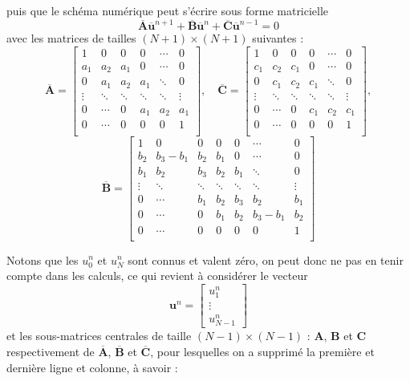 \documentclass[a4,12pt]{article}
\newcommand{\A}{\mathbf{A}}
\newcommand{\B}{\mathbf{B}}
\newcommand{\C}{\mathbf{C}}
\newcommand{\ub}{\mathbf{u}}
\begin{document}
	    puis que le schéma numérique peut s'écrire sous forme matricielle
	    \begin{equation}
	      \overline{\A} \overline{\ub}^{n+1}+\overline{\B} \overline{\ub}^n+\overline{\C} \overline{\ub}^{n-1}=0
	    \end{equation} 
	    avec les matrices de tailles $(N+1)\times (N+1)$ suivantes : 
	    \[
	      \overline{\A}=
	      \begin{bmatrix}
		1 & 0 & 0 & 0 & \cdots & 0 \\ 
		a_1 & a_2 & a_1 & 0 & \cdots & 0 \\ 
		0 & a_1 & a_2 & a_1 & \ddots & 0 \\
		\vdots & \ddots & \ddots & \ddots & \ddots & \vdots \\ 
		0 & \cdots & 0 & a_1 & a_2 & a_1\\ 
		0 & \cdots & 0 & 0 & 0 & 1 \\
	      \end{bmatrix},\quad 
	      \overline{\C}=
	      \begin{bmatrix}
		1 & 0 & 0 & 0 & \cdots & 0 \\ 
		c_1 & c_2 & c_1 & 0 & \cdots & 0 \\
		0 & c_1 & c_2 & c_1 & \ddots & 0 \\ 
		\vdots & \ddots & \ddots & \ddots & \ddots & \vdots \\
		0 & \cdots & 0 & c_1 & c_2 & c_1 \\
		0 & \cdots & 0 & 0 & 0 & 1 \\
	      \end{bmatrix},
	    \]
	    \[ 
	      \overline{\B}=
	      \begin{bmatrix}
		1 & 0 & 0 & 0 & 0  & \cdots & 0 \\ 
		b_2 & b_3-b_1 & b_2 & b_1 & 0 & \cdots & 0 \\ 
		b_1 & b_2 & b_3 & b_2 & b_1 & \ddots & 0 \\
		\vdots & \ddots & \ddots & \ddots & \ddots & \ddots & \vdots \\ 
		0 & \cdots & b_1 & b_2 & b_3 & b_2 & b_1 \\ 
		0 & \cdots &  0 & b_1 & b_2 & b_3-b_1 & b_2 \\ 
		0 & \cdots & 0 & 0 &  0 & 0 & 1 \\
	      \end{bmatrix}
	    \]


	    Notons que les $u_0^n$ et $u_{N}^n$ sont connus et valent zéro, on peut donc ne pas en tenir compte dans les calculs, ce qui revient à considérer le vecteur 
	    \[
	      \ub^n=\begin{bmatrix}u_1^n\\ \vdots \\ u_{N-1}^n\end{bmatrix}
	    \]
	    et les sous-matrices centrales de taille $(N-1)\times (N-1)$ : $\A$, $\B$ et $\C$ respectivement de $\overline{\A}$, $\overline{\B}$ et $\overline{\C}$, pour lesquelles on a supprimé la première et dernière ligne et colonne, à savoir :
\end{document}
